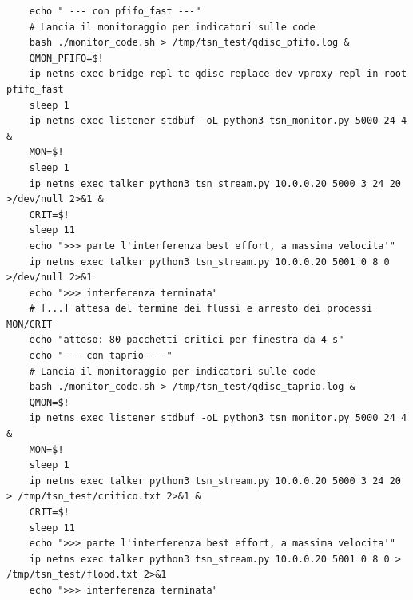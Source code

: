 \documentclass[12pt,a4paper,twoside]{book}
\begin{document}
\begin{onehalfspace}
\begin{lstlisting}
    echo " --- con pfifo_fast ---"
    # Lancia il monitoraggio per indicatori sulle code 
    bash ./monitor_code.sh > /tmp/tsn_test/qdisc_pfifo.log &
    QMON_PFIFO=$!
    ip netns exec bridge-repl tc qdisc replace dev vproxy-repl-in root pfifo_fast
    sleep 1
    ip netns exec listener stdbuf -oL python3 tsn_monitor.py 5000 24 4 &
    MON=$!
    sleep 1
    ip netns exec talker python3 tsn_stream.py 10.0.0.20 5000 3 24 20 >/dev/null 2>&1 &
    CRIT=$!
    sleep 11
    echo ">>> parte l'interferenza best effort, a massima velocita'"
    ip netns exec talker python3 tsn_stream.py 10.0.0.20 5001 0 8 0 >/dev/null 2>&1
    echo ">>> interferenza terminata"
    # [...] attesa del termine dei flussi e arresto dei processi MON/CRIT
    echo "atteso: 80 pacchetti critici per finestra da 4 s"
    echo "--- con taprio ---"
    # Lancia il monitoraggio per indicatori sulle code 
    bash ./monitor_code.sh > /tmp/tsn_test/qdisc_taprio.log &
    QMON=$!
    ip netns exec listener stdbuf -oL python3 tsn_monitor.py 5000 24 4 &
    MON=$!
    sleep 1
    ip netns exec talker python3 tsn_stream.py 10.0.0.20 5000 3 24 20 > /tmp/tsn_test/critico.txt 2>&1 &
    CRIT=$!
    sleep 11
    echo ">>> parte l'interferenza best effort, a massima velocita'"
    ip netns exec talker python3 tsn_stream.py 10.0.0.20 5001 0 8 0 > /tmp/tsn_test/flood.txt 2>&1
    echo ">>> interferenza terminata"
\end{lstlisting}


\end{onehalfspace}
\end{document}
